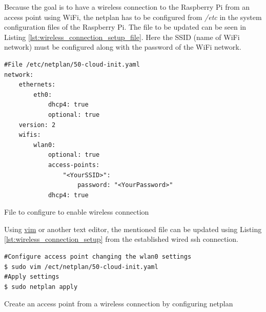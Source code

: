 \documentclass[../Head/report.tex]{subfiles}
\begin{document}
Because the goal is to have a wireless connection to the Raspberry Pi from an access point using WiFi, the netplan has to be configured from \textit{/etc}  in the system configuration files of the Raspberry Pi. The file to be updated can be seen in Listing \ref{lst:wireless_connection_setup_file}. Here the SSID (name of WiFi network) must be configured along with the password of the WiFi network. 

\begin{listing}[H] 
\begin{tcolorbox}[
    enhanced,
    attach boxed title to top left={xshift=6mm,yshift=-3mm},
    colback=lightgreen!20,
    colframe=lightgreen,
    fonttitle=\bfseries\color{black},
]
\begin{verbatim}
#File /etc/netplan/50-cloud-init.yaml
network:
    ethernets:
        eth0:
            dhcp4: true
            optional: true
    version: 2
    wifis:
        wlan0:
            optional: true
            access-points:
                "<YourSSID>":
                    password: "<YourPassword>"
            dhcp4: true

\end{verbatim}
\end{tcolorbox}
\caption{File to configure to enable wireless connection}
\label{lst:wireless_connection_setup_file}    
\end{listing}  

Using \href{https://www.vim.org/}{vim} or another text editor, the mentioned file can be updated using Listing \ref{lst:wireless_connection_setup} from the established wired ssh connection.  

\begin{listing}[H] 
\begin{tcolorbox}[
    enhanced,
    attach boxed title to top left={xshift=6mm,yshift=-3mm},
    colback=lightgreen!20,
    colframe=lightgreen,
    fonttitle=\bfseries\color{black},
]
\begin{verbatim}
#Configure access point changing the wlan0 settings
$ sudo vim /ect/netplan/50-cloud-init.yaml
#Apply settings  
$ sudo netplan apply
\end{verbatim}
\end{tcolorbox}
\caption{Create an access point from a wireless connection by configuring netplan}
\label{lst:wireless_connection_setup}    
\end{listing} 
\end{document}
